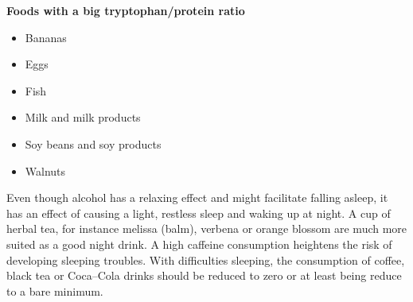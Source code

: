 \documentclass[../main.tex]{subfiles}
\begin{document}
\vspace{5mm}
\noindent
\begin{center}
\begin{fminipage}{0.45\textwidth}
  \textbf{Foods with a big tryptophan/protein ratio\label{box:tryptophan}}
  \begin{itemize}
  \item Bananas
  \item Eggs
  \item Fish
  \item Milk and milk products
  \item Soy beans and soy products
    \item Walnuts
  \end{itemize}
\end{fminipage}
\end{center}

Even though alcohol has a relaxing effect and might facilitate falling asleep,
it has an effect of causing a light, restless sleep and waking up at night.
A cup of herbal tea, for instance melissa (balm), verbena or orange blossom are much more suited as a good night drink.
A high caffeine consumption heightens the risk of developing sleeping troubles.
With difficulties sleeping, the consumption of coffee, black tea or Coca--Cola drinks should be reduced to zero or at least
being reduce to a bare minimum.
\end{document}
